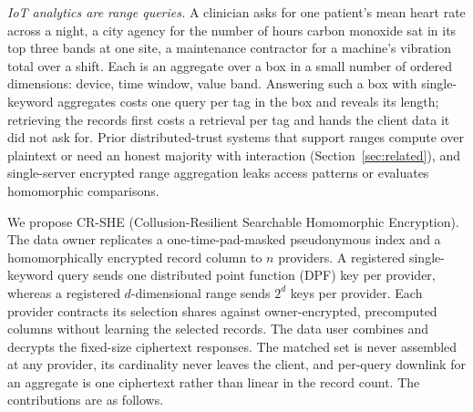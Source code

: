 \documentclass[a4paper,fleqn]{cas-sc}
\begin{document}
\emph{IoT analytics are range queries.} A clinician asks for one patient's
mean heart rate across a night, a city agency for the number of hours carbon
monoxide sat in its top three bands at one site, a maintenance contractor for a
machine's vibration total over a shift. Each is an aggregate over a box in a
small number of ordered dimensions: device, time window, value band. Answering
such a box with single-keyword aggregates costs one query per tag in the box
and reveals its length; retrieving the records first costs a retrieval per tag
and hands the client data it did not ask for. Prior distributed-trust systems
that support ranges compute over plaintext or need an honest majority with
interaction (Section~\ref{sec:related}), and single-server encrypted range
aggregation leaks access patterns or evaluates homomorphic comparisons.

We propose CR-SHE (Collusion-Resilient Searchable Homomorphic Encryption). The
data owner replicates a one-time-pad-masked pseudonymous index and a
homomorphically encrypted record column to $n$ providers. A registered single-keyword query sends one distributed point
function (DPF) key per provider, whereas a registered $d$-dimensional
range sends $2^d$ keys per provider. Each provider contracts
its selection shares against owner-encrypted, precomputed columns
without learning the selected records. The data user combines and
decrypts the fixed-size ciphertext responses. The matched set is never assembled at any provider, its cardinality
never leaves the client, and per-query downlink for an aggregate is one
ciphertext rather than linear in the record count. The contributions are as
follows.
\end{document}
